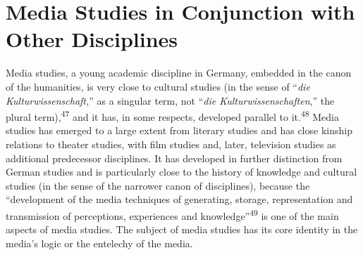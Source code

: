 \documentclass{tufte-handout}
\begin{document}
\hypertarget{media-studies-in-conjunction-with-other-disciplines}{%
\section{\texorpdfstring{Media Studies in Conjunction with Other
Disciplines
}{Media Studies in Conjunction with Other Disciplines }}\label{media-studies-in-conjunction-with-other-disciplines}}

Media studies, a young academic discipline in Germany, embedded in the
canon of the humanities, is very close to cultural studies (in the sense
of ``\emph{die Kulturwissenschaft,}'' as a singular term, not
``\emph{die Kulturwissenschaften},'' the plural term),\textsuperscript{47} and it has, in some respects, developed parallel to
it.\textsuperscript{48} Media studies has emerged to a large extent from literary
studies and has close kinship relations to theater studies, with film
studies and, later, television studies as additional predecessor
disciplines. It has developed in further distinction from German studies
and is particularly close to the history of knowledge and cultural
studies (in the sense of the narrower canon of disciplines), because the
``development of the media techniques of generating, storage,
representation and transmission of perceptions, experiences and
knowledge''\textsuperscript{49} is one of the main aspects of media studies. The
subject of media studies has its core identity in the media's logic or
the entelechy of the media.
\end{document}
